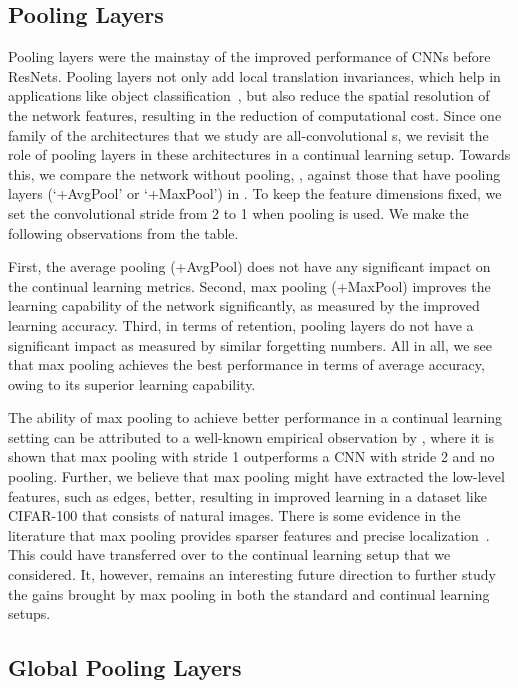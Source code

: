 \subsection{Pooling Layers}
\label{sec:analysis-pool}
Pooling layers were the mainstay of the improved performance of CNNs before ResNets. Pooling layers not only add local translation invariances, which help in applications like object classification~\citep{AlexNet,CoAtNet}, but also reduce the spatial resolution of the network features, resulting in the reduction of computational cost. Since one family of the architectures that we study are all-convolutional \CNN s, we revisit the role of pooling layers in these architectures in a continual learning setup. Towards this, we compare the network without pooling, \CNNArch, against those that have pooling layers (`\CNNArch+AvgPool' or `\CNNArch+MaxPool') in . To keep the feature dimensions fixed, we set the convolutional stride from 2 to 1 when pooling is used. We make the following observations from the table. 

First, the average pooling (+AvgPool) does not have any significant impact on the continual learning metrics. Second, max pooling (+MaxPool) improves the learning capability of the network significantly, as measured by the improved learning accuracy. Third, in terms of retention, pooling layers do not have a significant impact as measured by similar forgetting numbers. All in all, we see that max pooling achieves the best performance in terms of average accuracy, owing to its superior learning capability.

The ability of max pooling to achieve better performance in a continual learning setting can be attributed to a well-known empirical observation by \citet{Springenberg2015StrivingFS}, where it is shown that max pooling with stride 1 outperforms a CNN with stride 2 and no pooling. Further, we believe that max pooling might have extracted the low-level features, such as edges, better, resulting in improved learning in a dataset like CIFAR-100 that consists of natural images. There is some evidence in the literature that max pooling provides sparser features and precise localization~\citep{Zhou2016LearningDF}. This could have transferred over to the continual learning setup that we considered. It, however, remains an interesting future direction to further study the gains brought by max pooling in both the standard and continual learning setups. 

\subsection{Global Pooling Layers}
\label{sec:analysis-global-pool}

